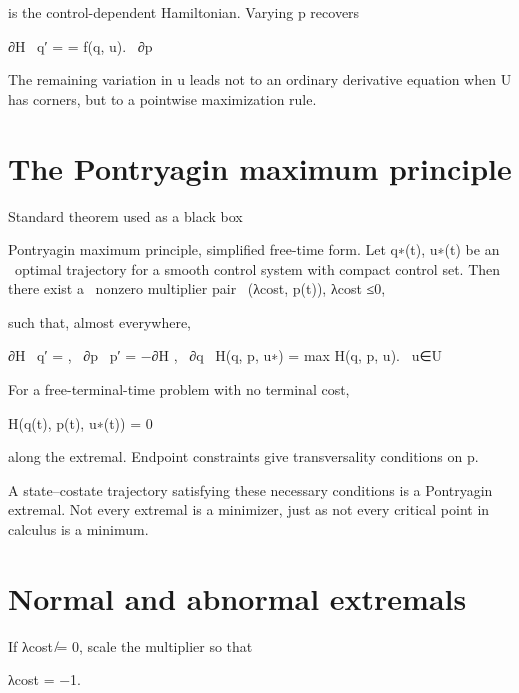 is the control-dependent Hamiltonian. Varying p recovers


\begin{displaytext}
∂H \
q′ = = f(q, u). \
∂p
\end{displaytext}

The remaining variation in u leads not to an ordinary derivative equation when U has corners, but to a pointwise maximization rule.


\section{The Pontryagin maximum principle}

\begin{insightbox}{Standard theorem used as a black box}
\end{insightbox}

\begin{displaytext}
Pontryagin maximum principle, simplified free-time form. Let q∗(t), u∗(t) be an \
optimal trajectory for a smooth control system with compact control set. Then there exist a \
nonzero multiplier pair \
(λcost, p(t)), λcost ≤0,
\end{displaytext}

such that, almost everywhere,


\begin{displaytext}
∂H \
q′ = , \
∂p \
p′ = −∂H , \
∂q \
H(q, p, u∗) = max H(q, p, u). \
u∈U
\end{displaytext}

For a free-terminal-time problem with no terminal cost,


H(q(t), p(t), u∗(t)) = 0


along the extremal. Endpoint constraints give transversality conditions on p.


A state–costate trajectory satisfying these necessary conditions is a Pontryagin extremal. Not every extremal is a minimizer, just as not every critical point in calculus is a minimum.


\section{Normal and abnormal extremals}

\begin{displaytext}
If λcost ̸= 0, scale the multiplier so that
\end{displaytext}

\begin{displaytext}
λcost = −1.
\end{displaytext}

